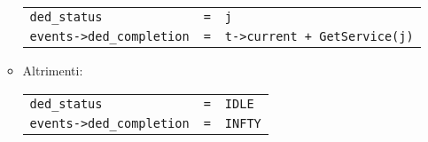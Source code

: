 \begin{itemize}
\begin{itemize}
\begin{center}
\begin{tabular}{l l l}
\texttt{ded\_status} & \texttt{=} & \texttt{j} \\
\texttt{events->ded\_completion} & \texttt{=} & \texttt{t->current + GetService(j)}
\end{tabular}
\end{center}
\item Altrimenti:
\begin{center}
\begin{tabular}{l l l}
\texttt{ded\_status} & \texttt{=} & \texttt{IDLE} \\
\texttt{events->ded\_completion} & \texttt{=} & \texttt{INFTY}
\end{tabular}
\end{center}
\end{itemize}
\end{itemize}
